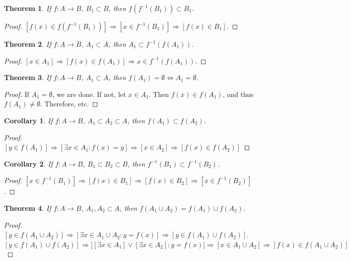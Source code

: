 \documentclass[oneside]{book}
\theoremstyle{mystyle}
\newtheorem{theorem}{Theorem}[section]
\newtheorem{corollary}{Corollary}[section]
\begin{document}
\begin{theorem}
If $f:A\rightarrow B$, $B_1\subset B$, then $f(f^{-1}(B_1))\subset B_1$.
\end{theorem}
\begin{proof}
$[f(x)\in f(f^{-1}(B_1))]\Rightarrow [x\in f^{-1}(B_1)]\Rightarrow [f(x)\in B_1]$.
\end{proof}

\begin{theorem}
If $f:A\rightarrow B$, $A_1\subset A$, then $A_1\subset f^{-1}(f(A_1))$.
\end{theorem}
\begin{proof}
$[x\in A_1]\Rightarrow [f(x) \in f(A_1)]\Rightarrow x\in f^{-1}(f(A_1))$.
\end{proof}

\begin{theorem}
If $f:A\rightarrow B$, $A_1\subset A$, then $f(A_1) = \emptyset \Leftrightarrow A_1 = \emptyset$.
\end{theorem}
\begin{proof}
If $A_1 = \emptyset$, we are done. If not, let $x\in A_1$. Then $f(x)\in f(A_1)$, and thus $f(A_1)\ne \emptyset$. Therefore, etc.
\end{proof}

\begin{corollary}
If $f:A\rightarrow B$, $A_1\subset A_2\subset A$, then $f(A_1)\subset f(A_2)$.
\end{corollary}
\begin{proof}
$[y\in f(A_1)]\Rightarrow[\exists x\in A_1:f(x)=y]\Rightarrow [x\in A_2] \Rightarrow [f(x)\in f(A_2)]$
\end{proof}

\begin{corollary}
If $f:A\rightarrow B$, $B_1\subset B_2\subset B$, then $f^{-1}(B_1)\subset f^{-1}(B_2)$.
\end{corollary}
\begin{proof}
$[x\in f^{-1}(B_1)] \Rightarrow [f(x) \in B_1] \Rightarrow [f(x) \in B_2]\Rightarrow [x\in f^{-1}(B_2)]$.
\end{proof}

\begin{theorem}
If $f:A\rightarrow B$, $A_1,A_2\subset A$, then $f(A_1 \cup A_2) = f(A_1)\cup f(A_2)$.
\end{theorem}
\begin{proof}
$[y\in f(A_1\cup A_2)]\Rightarrow [\exists x\in A_1 \cup A_2:y=f(x)]\Rightarrow [y \in f(A_1)\cup f(A_2)]$. $[y\in f(A_1)\cup f(A_2)]\Rightarrow \big[[\exists x\in A_1] \lor [\exists x\in A_2]: y=f(x)\big]\Rightarrow [x\in A_1\cup A_2]\Rightarrow [f(x)\in f(A_1\cup A_2)]$
\end{proof}
\end{document}
